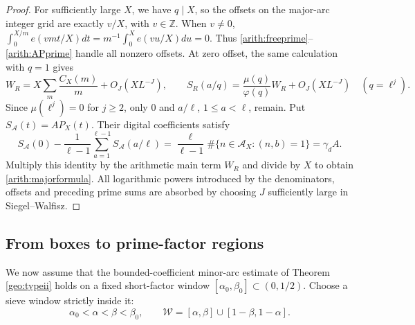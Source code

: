 \documentclass[11pt,a4paper]{article}
\theoremstyle{paperplain}
\numberwithin{equation}{section}
\begin{document}
\begin{proof}
For sufficiently large $X$, we have $q\mid X$, so the offsets on the
major-arc integer grid are exactly $v/X$, with $v\in\mathbb Z$.
When $v\ne0$,
$\int_0^{X/m}e(vmt/X)dt=m^{-1}\int_0^Xe(vu/X)du=0$.
Thus \eqref{arith:freeprime}--\eqref{arith:APprime} handle all nonzero
offsets. At zero offset, the same calculation with $q=1$ gives
\[
 W_R=X\sum_m\frac{C_X(m)}m+O_J(XL^{-J}),
 \qquad
 S_R(a/q)=\frac{\mu(q)}{\varphi(q)}W_R+O_J(XL^{-J})
 \quad(q=\ell^j).
\]
Since $\mu(\ell^j)=0$ for $j\ge2$, only $0$ and $a/\ell$,
$1\le a<\ell$, remain. Put $S_{\mathcal A}(t)=AP_X(t)$.
Their digital coefficients satisfy
\[
 S_{\mathcal A}(0)-\frac1{\ell-1}
                  \sum_{a=1}^{\ell-1}S_{\mathcal A}(a/\ell)
 =\frac{\ell}{\ell-1}\#\{n\in\mathcal A_X:(n,b)=1\}
 =\gamma_d A.
\]
Multiply this identity by the arithmetic main term $W_R$ and divide
by $X$ to obtain \eqref{arith:majorformula}. All logarithmic powers
introduced by the denominators, offsets and preceding prime sums
are absorbed by choosing $J$ sufficiently large in Siegel--Walfisz.
\end{proof}

\subsection{From boxes to prime-factor regions}

We now assume that the bounded-coefficient minor-arc estimate of
Theorem \ref{geo:typeii} holds on a fixed short-factor window
$[\alpha_0,\beta_0]\subset(0,1/2)$.
Choose a sieve window strictly inside it:
\begin{equation}\label{arith:window}
 \alpha_0<\alpha<\beta<\beta_0,
 \qquad \mathcal W=[\alpha,\beta]\cup[1-\beta,1-\alpha].
\end{equation}
\end{document}
